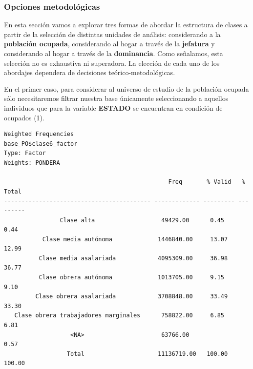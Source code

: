 \documentclass[
]{article}
\newenvironment{Shaded}{\begin{snugshade}}{\end{snugshade}}
\newcommand{\AttributeTok}[1]{\textcolor[rgb]{0.13,0.29,0.53}{#1}}
\newcommand{\CommentTok}[1]{\textcolor[rgb]{0.56,0.35,0.01}{\textit{#1}}}
\newcommand{\ConstantTok}[1]{\textcolor[rgb]{0.56,0.35,0.01}{#1}}
\newcommand{\DecValTok}[1]{\textcolor[rgb]{0.00,0.00,0.81}{#1}}
\newcommand{\FunctionTok}[1]{\textcolor[rgb]{0.13,0.29,0.53}{\textbf{#1}}}
\newcommand{\NormalTok}[1]{#1}
\newcommand{\OtherTok}[1]{\textcolor[rgb]{0.56,0.35,0.01}{#1}}
\newcommand{\SpecialCharTok}[1]{\textcolor[rgb]{0.81,0.36,0.00}{\textbf{#1}}}
\newcommand{\StringTok}[1]{\textcolor[rgb]{0.31,0.60,0.02}{#1}}
\begin{document}
\hypertarget{opciones-metodoluxf3gicas}{%
\subsubsection{Opciones metodológicas}\label{opciones-metodoluxf3gicas}}

En esta sección vamos a explorar tres formas de abordar la estructura de clases a partir de la selección de distintas unidades de análisis: considerando a la \textbf{población ocupada}, considerando al hogar a través de la \textbf{jefatura} y considerando al hogar a través de la \textbf{dominancia}. Como señalamos, esta selección no es exhaustiva ni superadora. La elección de cada uno de los abordajes dependera de decisiones teórico-metodológicas.

En el primer caso, para considerar al universo de estudio de la población ocupada sólo necesitaremos filtrar nuestra base únicamente seleccionando a aquellos individuos que para la variable \textbf{ESTADO} se encuentran en condición de ocupados (1).

\begin{Shaded}
\end{Shaded}

\begin{verbatim}
Weighted Frequencies  
base_PO$clase6_factor  
Type: Factor  
Weights: PONDERA  

                                               Freq       % Valid   % Total 
------------------------------------------ ------------- --------- ---------
                Clase alta                   49429.00      0.45      0.44   
           Clase media autónoma             1446840.00     13.07     12.99  
          Clase media asalariada            4095309.00     36.98     36.77  
          Clase obrera autónoma             1013705.00     9.15      9.10   
         Clase obrera asalariada            3708848.00     33.49     33.30  
   Clase obrera trabajadores marginales      758822.00     6.85      6.81   
                   <NA>                      63766.00                0.57   
                  Total                     11136719.00   100.00    100.00  
\end{verbatim}
\end{document}
